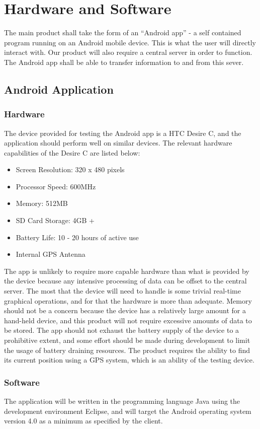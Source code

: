 \section{Hardware and Software}
	The main product shall take the form of an ``Android app'' - a self contained program running on an Android mobile device. This is what the user will directly interact with. Our product will also require a central server in order to function. The Android app shall be able to transfer information to and from this sever.
	\subsection{Android Application}
		\subsubsection{Hardware}
			The device provided for testing the Android app is a HTC Desire C, and the application should perform well on similar devices. The relevant hardware capabilities of the Desire C are listed below\cite{htcdesirex}:

			\begin{itemize}
				\item Screen Resolution: 320 x 480 pixels
				\item Processor Speed: 600MHz
				\item Memory: 512MB
				\item SD Card Storage: 4GB +
				\item Battery Life: 10 - 20 hours of active use
				\item Internal GPS Antenna
			\end{itemize}

			\noindent
			The app is unlikely to require more capable hardware than what is provided by the device because any intensive processing of data can be offset to the central server. The most that the device will need to handle is some trivial real-time graphical operations, and for that the hardware is more than adequate. Memory should not be a concern because the device has a relatively large amount for a hand-held device, and this product will not require excessive amounts of data to be stored. The app should not exhaust the battery supply of the device to a prohibitive extent, and some effort should be made during development to limit the usage of battery draining resources. The product requires the ability to find its current position using a GPS system, which is an ability of the testing device.
		\subsubsection{Software}
			The application will be written in the programming language Java using the development environment Eclipse, and will target the Android operating system version 4.0 as a minimum as specified by the client.

